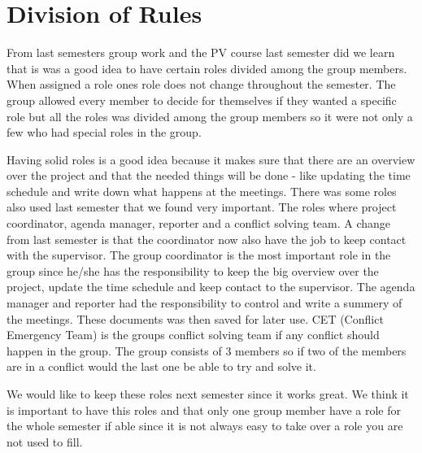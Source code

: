 \section{Division of Rules}
From last semesters group work and the PV course last semester did we learn that is was a good idea to have certain roles divided among the group members. When assigned a role ones role does not change throughout the semester. The group allowed every member to decide for themselves if they wanted a specific role but all the roles was divided among the group members so it were not only a few who had special roles in the group.

Having solid roles is a good idea because it makes sure that there are an overview over the project and that the needed things will be done - like updating the time schedule and write down what happens at the meetings.
There was some roles also used last semester that we found very important. The roles where project coordinator, agenda manager, reporter and a conflict solving team. A change from last semester is that the coordinator now also have the job to keep contact with the supervisor.
The group coordinator is the most important role in the group since he/she has the responsibility to keep the big overview over the project, update the time schedule and keep contact to the supervisor. 
The agenda manager and reporter had the responsibility to control and write a summery of the meetings. These documents was then saved for later use. CET (Conflict Emergency Team) is the groups conflict solving team if any conflict should happen in the group. The group consists of 3 members so if two of the members are in a conflict would the last one be able to try and solve it.

We would like to keep these roles next semester since it works great. We think it is important to have this roles and that only one group member have a role for the whole semester if able since it is not always easy to take over a role you are not used to fill.
